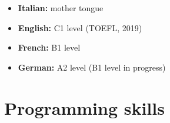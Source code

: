 \documentclass[10pt, a4paper, roman]{moderncv}        %
\begin{document}
\begin{itemize}

\item \textbf{Italian:} mother tongue

\vspace{1pt}

\item \textbf{English:} C1 level (TOEFL, 2019)

\vspace{1pt}

\item \textbf{French:} B1 level

\vspace{1pt}

\item \textbf{German:} A2 level (B1 level in progress)

\end{itemize}

\vspace{2pt}

\section{Programming skills}

\vspace{1pt}
\end{document}
